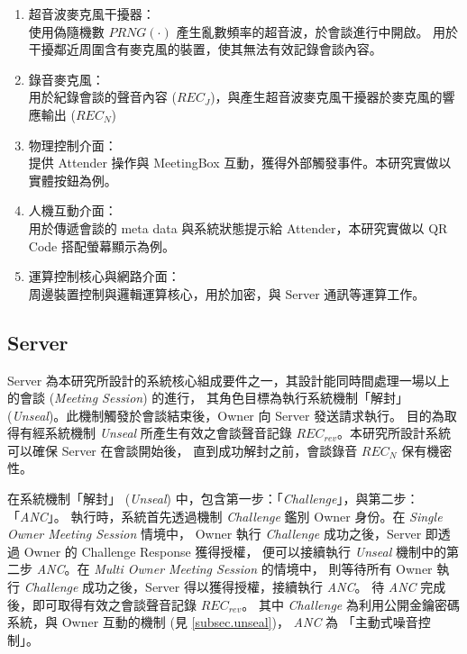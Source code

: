     \begin{enumerate}
        \item 超音波麥克風干擾器：\\
            使用偽隨機數 $PRNG(·)$ 產生亂數頻率的超音波，於會談進行中開啟。
            用於干擾鄰近周圍含有麥克風的裝置，使其無法有效記錄會談內容。

        \item 錄音麥克風：\\
            用於紀錄會談的聲音內容 ($REC_{J}$)，與產生超音波麥克風干擾器於麥克風的響應輸出 ($REC_{N}$)

        \item 物理控制介面：\\
            提供 Attender 操作與 MeetingBox 互動，獲得外部觸發事件。本研究實做以實體按鈕為例。

        \item 人機互動介面：\\
            用於傳遞會談的 meta data 與系統狀態提示給 Attender，本研究實做以 QR Code 搭配螢幕顯示為例。

        \item 運算控制核心與網路介面：\\
            周邊裝置控制與邏輯運算核心，用於加密，與 Server 通訊等運算工作。
    \end{enumerate}


\subsection{Server}

    Server 為本研究所設計的系統核心組成要件之一，其設計能同時間處理一場以上的會談 ({\it Meeting Session}) 的進行，
其角色目標為執行系統機制「解封」 ({\it Unseal})。此機制觸發於會談結束後，Owner 向 Server 發送請求執行。
目的為取得有經系統機制 {\it Unseal} 所產生有效之會談聲音記錄 $REC_{rev}$。本研究所設計系統可以確保 Server 在會談開始後，
直到成功解封之前，會談錄音 $REC_{N}$ 保有機密性。

    在系統機制「解封」 ({\it Unseal}) 中，包含第一步：「{\it Challenge}」，與第二步：「{\it ANC}」。
執行時，系統首先透過機制 {\it Challenge} 鑑別 Owner 身份。在 {\it Single Owner Meeting Session} 情境中，
Owner 執行 {\it Challenge} 成功之後，Server 即透過 Owner 的 Challenge Response 獲得授權，
便可以接續執行 {\it Unseal} 機制中的第二步 {\it ANC}。在 {\it Multi Owner Meeting Session} 的情境中，
則等待所有 Owner 執行 {\it Challenge} 成功之後，Server 得以獲得授權，接續執行 {\it ANC}。
待 {\it ANC} 完成後，即可取得有效之會談聲音記錄 $REC_{rev}$。
其中 {\it Challenge} 為利用公開金鑰密碼系統，與 Owner 互動的機制 (見 \ref{subsec.unseal})，
{\it ANC} 為 「主動式噪音控制」。

